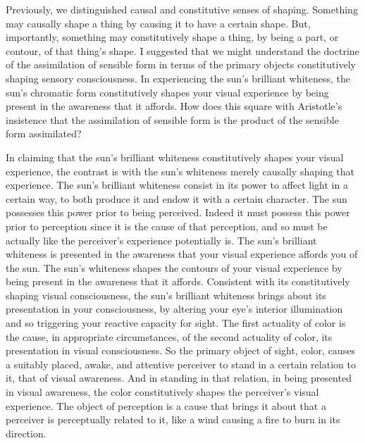 Previously, we distinguished causal and constitutive senses of shaping. Something may causally shape a thing by causing it to have a certain shape. But, importantly, something may constitutively shape a thing, by being a part, or contour, of that thing's shape. I suggested that we might understand the doctrine of the assimilation of sensible form in terms of the primary objects constitutively shaping sensory consciousness. In experiencing the sun's brilliant whiteness, the sun's chromatic form constitutively shapes your visual experience by being present in the awareness that it affords. How does this square with Aristotle's insistence that the assimilation of sensible form is the product of the sensible form assimilated?

In claiming that the sun's brilliant whiteness constitutively shapes your visual experience, the contrast is with the sun's whiteness merely causally shaping that experience. The sun's brilliant whiteness consist in its power to affect light in a certain way, to both produce it and endow it with a certain character. The sun possesses this power prior to being perceived. Indeed it must possess this power prior to perception since it is the cause of that perception, and so must be actually like the perceiver's experience potentially is. The sun's brilliant whiteness is presented in the awareness that your visual experience affords you of the sun. The sun's whiteness shapes the contours of your visual experience by being present in the awareness that it affords. Consistent with its constitutively shaping visual consciousness, the sun's brilliant whiteness brings about its presentation in your consciousness, by altering your eye's interior illumination and so triggering your reactive capacity for sight. The first actuality of color is the cause, in appropriate circumstances, of the second actuality of color, its presentation in visual consciousness. So the primary object of sight, color, causes a suitably placed, awake, and attentive perceiver to stand in a certain relation to it, that of visual awareness. And in standing in that relation, in being presented in visual awareness, the color constitutively shapes the perceiver's visual experience. The object of perception is a cause that brings it about that a perceiver is perceptually related to it, like a wind causing a fire to burn in its direction.

